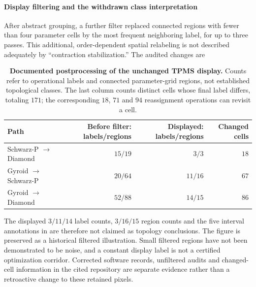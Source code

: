 \documentclass[10pt,twocolumn]{article}
\begin{document}
\paragraph{Display filtering and the withdrawn class interpretation}
After abstract grouping, a further filter replaced connected regions with fewer than four parameter cells by the most frequent neighboring label, for up to three passes. This additional, order-dependent spatial relabeling is not described adequately by ``contraction stabilization.'' The audited changes are
\begin{table}[!t]
\centering\small
\begin{tabular}{lrrr}
\hline
Path & Before filter: labels/regions & Displayed: labels/regions & Changed cells\\\hline
Schwarz-P $\to$ Diamond & $15/19$ & $3/3$ & $18$\\
Gyroid $\to$ Schwarz-P & $20/64$ & $11/16$ & $67$\\
Gyroid $\to$ Diamond & $52/88$ & $14/15$ & $86$\\\hline
\end{tabular}
\caption{\textbf{Documented postprocessing of the unchanged TPMS display.} Counts refer to operational labels and connected parameter-grid regions, not established topological classes. The last column counts distinct cells whose final label differs, totaling $171$; the corresponding $18$, $71$ and $94$ reassignment operations can revisit a cell.}
\label{supptab:tpms_filter}
\end{table}

The displayed $3/11/14$ label counts, $3/16/15$ region counts and the five interval annotations in  are therefore not claimed as topology conclusions. The figure is preserved as a historical filtered illustration. Small filtered regions have not been demonstrated to be noise, and a constant display label is not a certified optimization corridor. Corrected software records, unfiltered audits and changed-cell information in the cited repository are separate evidence rather than a retroactive change to these retained pixels.
\end{document}

